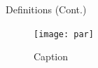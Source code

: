 \documentclass{beamer}
\begin{document}
\begin{frame}{Definitions (Cont.)}
    \begin{figure}
        \centering
        \texttt{[image: par]}
        \caption{Caption}
        \label{fig:my_label}
    \end{figure}
\end{frame}



\end{document}
